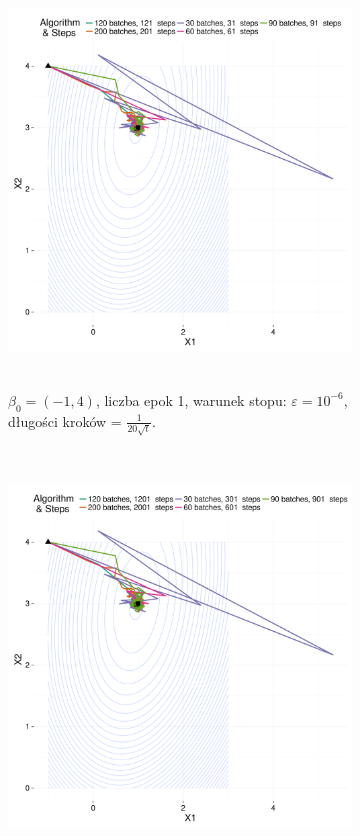 \begin{figure}[hbt!]
  \begin{center}
   \begin{subfigure}[h!]{0.9\textwidth}
      \includegraphics[width=\textwidth, height=310pt]{Obrazki/b_m1_4_iter_1_e-6_20sqrt.pdf}
      \caption{$\beta_0=(-1,4)$, liczba epok 1, warunek stopu: $\varepsilon=10^{-6}$, długości kroków = $\frac{1}{20\sqrt{t}}$.}
   \end{subfigure}     
   \begin{subfigure}[h!]{0.9\textwidth}
      \includegraphics[width=\textwidth, height=310pt]{Obrazki/b_m1_4_iter_10_e-5_20sqrt.pdf}

\end{subfigure}
\end{center}
\end{figure}
